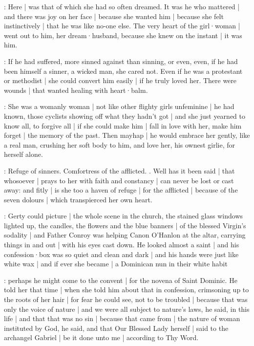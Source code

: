 \gertySex:
Here |
was that of which she had so often dreamed.
It was he who mattered |
and there was joy on her face |
because she wanted him |
because she felt instinctively |
that he was like no-one else.%
The very heart of the girl·woman |
went out to him,
her dream·husband,
because she knew on the instant |
it was him.

\gertyNovel:
If he had suffered,
more sinned against than sinning,
or even,
even,
if he had been himself a sinner,
a wicked man,
she cared not.
Even if he was a protestant or methodist |
she could convert him easily |
if he truly loved her.
There were wounds |
that wanted healing with heart·balm.

\gertySex:
She was a womanly woman |
not like other flighty girls unfeminine |
he had known,
those cyclists showing off what they hadn't got |
and she just yearned to know all,
to forgive all |
if she could make him |
fall in love with her,
make him forget |
the memory of the past.
Then mayhap |
he would embrace her gently,
like a real man,
crushing her soft body to him,%
and love her,
his ownest girlie,
for herself alone.

\Nrelig:
Refuge of sinners.
Comfortress of the afflicted.
.
Well has it been said |
that whosoever |
prays to her with faith and constancy |
can never be lost or cast away:
and fitly |
is she too a haven of refuge |
for the afflicted |
because of the seven dolours |
which transpierced her own heart.

\gertyReal:
Gerty could picture |
the whole scene in the church,
the stained glass windows lighted up,
the candles,
the flowers
and the blue banners |
of the blessed Virgin's sodality |
and Father Conroy
was helping Canon O'Hanlon at the altar,
carrying things in and out |
with his eyes cast down.
He looked almost a saint |%
and his confession·box
was so quiet and clean and dark |
and his hands were just like white wax |
and if ever she became |
a Dominican nun in their white habit

\gertySex:
perhaps he might come to the convent |
for the novena of Saint Dominic.
He told her that time |
when she told him about that in confession,
crimsoning up to the roots of her hair |
for fear he could see,
not to be troubled |
because that was only the voice of nature |
and we were all subject to nature's laws,
he said,
in this life |
and that that was no sin |
because that came from |
the nature of woman instituted by God,
he said,
and that Our Blessed Lady herself |
said to the archangel Gabriel |
be it done unto me |
according to Thy Word.

